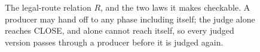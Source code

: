 \begin{figure}[t]
  \centering
  
  \caption{The legal-route relation $R$, and the two laws it makes checkable.
  A producer may hand off to any phase including itself; the judge alone reaches
  CLOSE, and alone cannot reach itself, so every judged version passes through a
  producer before it is judged again.}
  \label{fig:qpw1-route-relation}
\end{figure}
